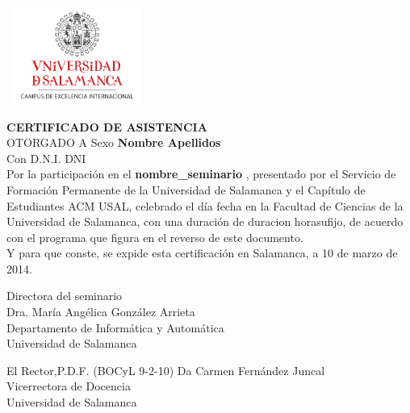 \documentclass[spanish]{article}
\begin{document}
\hbox{
	\includegraphics[height=3.2cm]{usallogo}
	\hspace{14.2cm}
}
\vspace{0.5cm}
\begin{center}

{\LARGE \textbf{CERTIFICADO DE ASISTENCIA}\\[0.5cm]}
{\Large OTORGADO A {{Sexo}}\textbf{ {{Nombre}} {{Apellidos}} }\\[0.2cm]}
{Con D.N.I. {{DNI}}\\[0.3cm]}
{\large Por la participación en el\textbf{ {{nombre_seminario}} }, presentado por el Servicio de Formación Permanente de la Universidad de Salamanca y el Capítulo de Estudiantes ACM USAL, celebrado el día {{fecha}} en la Facultad de Ciencias de la Universidad de Salamanca, con una duración de {{duracion}} hora{{sufijo}}, de acuerdo con el programa que figura en el reverso de este documento.\\[0.5cm]
Y para que conste, se expide esta certificación en Salamanca, a 10 de marzo de 2014.\\}

\vspace*{2cm}

\parbox{0.9\textwidth}{
	\parbox{7cm}{
		\centering
		Directora del seminario\\
		\vspace*{2cm}
		Dra. María Angélica González Arrieta\\
		Departamento de Informática y Automática\\
		Universidad de Salamanca
	}
	\hfill
	\parbox{7cm}{
		\centering
		El Rector,P.D.F. (BOCyL 9-2-10)
		\vspace*{2cm}
		Da Carmen Fernández Juncal\\
		Vicerrectora de Docencia\\
		Universidad de Salamanca
	}
}
\end{center}
\newpage
\end{document}
